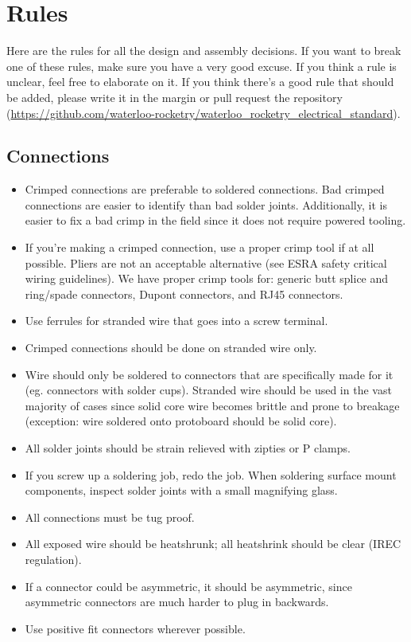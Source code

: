 \documentclass{article}
\begin{document}
\section{Rules}
Here are the rules for all the design and assembly decisions. If you want to break one of these rules, make sure you have a very good excuse. If you think a rule is unclear, feel free to elaborate on it. If you think there's a good rule that should be added, please write it in the margin or pull request the repository (\url{https://github.com/waterloo-rocketry/waterloo\_rocketry\_electrical\_standard}).

\subsection{Connections}
\begin{itemize}
\item Crimped connections are preferable to soldered connections. Bad crimped connections are easier to identify than bad solder joints. Additionally, it is easier to fix a bad crimp in the field since it does not require powered tooling.
\item If you're making a crimped connection, use a proper crimp tool if at all possible. Pliers are not an acceptable alternative (see ESRA safety critical wiring guidelines). We have proper crimp tools for: generic butt splice and ring/spade connectors, Dupont connectors, and RJ45 connectors.
\item Use ferrules for stranded wire that goes into a screw terminal.
\item Crimped connections should be done on stranded wire only.
\item Wire should only be soldered to connectors that are specifically made for it (eg. connectors with solder cups). Stranded wire should be used in the vast majority of cases since solid core wire becomes brittle and prone to breakage (exception: wire soldered onto protoboard should be solid core).
\item All solder joints should be strain relieved with zipties or P clamps.
\item If you screw up a soldering job, redo the job. When soldering surface mount components, inspect solder joints with a small magnifying glass.
\item All connections must be tug proof.
\item All exposed wire should be heatshrunk; all heatshrink should be clear (IREC regulation).
\item If a connector could be asymmetric, it should be asymmetric, since asymmetric connectors are much harder to plug in backwards.
\item Use positive fit connectors wherever possible.
\end{itemize}
\end{document}
